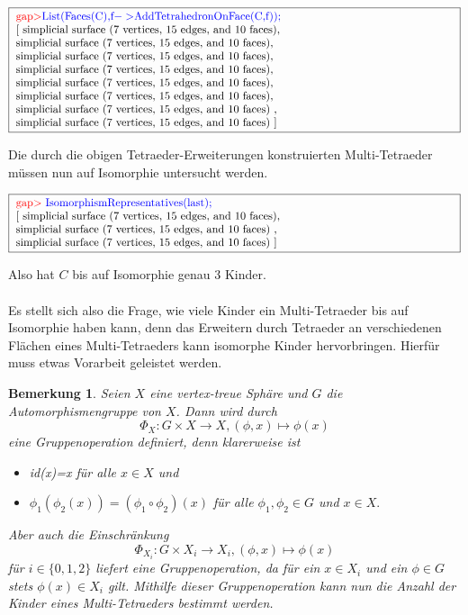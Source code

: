 \documentclass[12pt,titlepage,twoside,cleardoublepage]{article}
\theoremstyle{nummermitklammern}
\newtheorem{bemerkung}[temp]{Bemerkung}
\newtheorem{bemerkung}[zahl]{Bemerkung}
\numberwithin{equation}{section}
\begin{document}
\begin{center}
$\fbox{
\parbox{14cm}{
\textcolor{red}{gap$>$}\textcolor{blue}{ List(Faces(C),f$->$AddTetrahedronOnFace(C,f));}\newline
[ simplicial surface (7 vertices, 15 edges, and 10 faces),\newline
simplicial surface (7 vertices, 15 edges, and 10 faces),\newline
 simplicial surface (7 vertices, 15 edges, and 10 faces),\newline
 simplicial surface (7 vertices, 15 edges, and 10 faces),\newline
 simplicial surface (7 vertices, 15 edges, and 10 faces),\newline
 simplicial surface (7 vertices, 15 edges, and 10 faces),\newline
  simplicial surface (7 vertices, 15 edges, and 10 faces)
    ,\newline
  simplicial surface (7 vertices, 15 edges, and 10 faces)
 ]
 }}$
 \end{center}
 Die durch die obigen Tetraeder-Erweiterungen konstruierten Multi-Tetraeder müssen nun auf Isomorphie untersucht werden.
 \begin{center} 
 $\fbox{
\parbox{14cm}{
\textcolor{red}{gap$>$} \textcolor{blue}{IsomorphismRepresentatives(last);}\newline
[ simplicial surface (7 vertices, 15 edges, and 10 faces),\newline
 simplicial surface (7 vertices, 15 edges, and 10 faces)
    ,
    \newline
  simplicial surface (7 vertices, 15 edges, and 10 faces)
 ]
}}$
\end{center}
Also hat $C$ bis auf Isomorphie genau 3 Kinder. \\\\
Es stellt sich also die Frage, wie viele Kinder ein Multi-Tetraeder bis auf Isomorphie haben kann, denn das Erweitern durch Tetraeder an verschiedenen Flächen eines Multi-Tetraeders kann isomorphe Kinder hervorbringen. Hierfür muss etwas Vorarbeit geleistet werden.
\begin{bemerkung} \label{bembahn}
Seien $X$ eine vertex-treue Sphäre und $G$ die Automorphismengruppe von $X$. Dann wird durch 
\[
\Phi_X:G \times X\to X,(\phi, x)\mapsto \phi(x)
\] eine Gruppenoperation definiert, denn klarerweise ist
\begin{itemize}
\item id(x)=x für alle $x\in X$ und
\item $\phi_1(\phi_2 (x))=(\phi_1 \circ\phi_2)(x)$ für alle $\phi_1,\phi_2 \in G$ und $x\in X.$
\end{itemize}
Aber auch die Einschränkung   
\[
\Phi_{X_i}:G \times X_i\to X_i,(\phi, x)\mapsto \phi(x)
\] für $i\in \{0,1,2\}$ liefert eine Gruppenoperation, da für ein $x\in X_i$ und ein $\phi\in G$ stets $\phi(x)\in X_i$ gilt. Mithilfe dieser Gruppenoperation kann nun die Anzahl der Kinder eines Multi-Tetraeders bestimmt werden.
\end{bemerkung}
\end{document}
